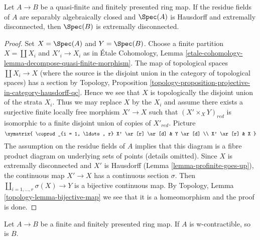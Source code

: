 \begin{lemma}
\label{lemma-finite-finitely-presented-over-extremally-disconnected}
Let $A \to B$ be a quasi-finite and finitely presented ring map.
If the residue fields of $A$ are separably algebraically closed
and $\Spec(A)$ is Hausdorff and extremally disconnected, then $\Spec(B)$ is
extremally disconnected.
\end{lemma}

\begin{proof}
Set $X = \Spec(A)$ and $Y = \Spec(B)$. Choose a finite partition
$X = \coprod X_i$ and $X'_i \to X_i$ as in
\'Etale Cohomology, Lemma
\ref{etale-cohomology-lemma-decompose-quasi-finite-morphism}.
The map of topological spaces $\coprod X_i \to X$ (where the source
is the disjoint union in the category of topological spaces)
has a section by Topology, Proposition
\ref{topology-proposition-projective-in-category-hausdorff-qc}.
Hence we see that $X$ is topologically the disjoint union of the
strata $X_i$. Thus we may replace $X$ by the $X_i$ and assume there
exists a surjective finite locally free morphism $X' \to X$ such that
$(X' \times_X Y)_{red}$ is isomorphic to a finite disjoint union of
copies of $X'_{red}$. Picture
$$
\xymatrix{
\coprod_{i = 1, \ldots, r} X' \ar[r] \ar[d] & Y \ar[d] \\
X' \ar[r] & X
}
$$
The assumption on the residue fields of $A$ implies that
this diagram is a fibre product diagram on underlying sets
of points (details omitted).
Since $X$ is extremally disconnected and $X'$ is Hausdorff
(Lemma \ref{lemma-profinite-goes-up}), the continuous map
$X' \to X$ has a continuous section $\sigma$. Then
$\coprod_{i = 1, \ldots, r} \sigma(X) \to Y$ is a bijective
continuous map. By
Topology, Lemma \ref{topology-lemma-bijective-map}
we see that it is a homeomorphism and the proof is done.
\end{proof}

\begin{lemma}
\label{lemma-finite-finitely-presented-over-w-contractible}
Let $A \to B$ be a finite and finitely presented ring map.
If $A$ is w-contractible, so is $B$.
\end{lemma}

